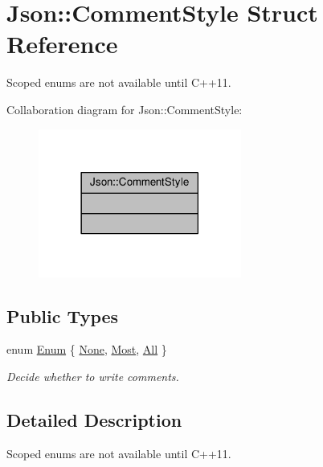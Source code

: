 \hypertarget{structJson_1_1CommentStyle}{}\section{Json\+:\+:Comment\+Style Struct Reference}
\label{structJson_1_1CommentStyle}


Scoped enums are not available until C++11.  




Collaboration diagram for Json\+:\+:Comment\+Style\+:
\nopagebreak
\begin{figure}[H]
\begin{center}
\leavevmode
\includegraphics[width=189pt]{d5/da0/structJson_1_1CommentStyle__coll__graph}
\end{center}
\end{figure}
\subsection*{Public Types}
\begin{DoxyCompactItemize}
\item 
enum \hyperlink{structJson_1_1CommentStyle_a51fc08f3518fd81eba12f340d19a3d0c}{Enum} \{ \hyperlink{structJson_1_1CommentStyle_a51fc08f3518fd81eba12f340d19a3d0cac8b32a8bae63414c8647d4919da8d437}{None}, 
\hyperlink{structJson_1_1CommentStyle_a51fc08f3518fd81eba12f340d19a3d0cac65238f050773c107690a456e9c05c98}{Most}, 
\hyperlink{structJson_1_1CommentStyle_a51fc08f3518fd81eba12f340d19a3d0ca32302c0b97190c1808b3e38f367fef01}{All}
 \}\begin{DoxyCompactList}\small\item\em Decide whether to write comments. \end{DoxyCompactList}
\end{DoxyCompactItemize}


\subsection{Detailed Description}
Scoped enums are not available until C++11. 

